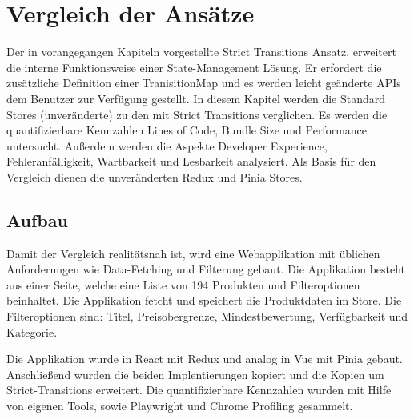 \chapter{Vergleich der Ansätze} \label{vergleich}


Der in vorangegangen Kapiteln vorgestellte Strict Transitions Ansatz, erweitert die interne Funktionsweise einer State-Management Lösung. Er erfordert die zusätzliche Definition einer TranisitionMap und es werden leicht geänderte APIs dem Benutzer zur Verfügung gestellt. In diesem Kapitel werden die Standard Stores (unveränderte) zu den mit Strict Transitions verglichen. Es werden die quantifizierbare Kennzahlen Lines of Code, Bundle Size und Performance untersucht. Außerdem werden die Aspekte Developer Experience, Fehleranfälligkeit, Wartbarkeit und Lesbarkeit analysiert. Als Basis für den Vergleich dienen die unveränderten Redux und Pinia Stores.

\section{Aufbau}

Damit der Vergleich realitätsnah ist, wird eine Webapplikation mit üblichen Anforderungen wie Data-Fetching und Filterung gebaut. Die Applikation besteht aus einer Seite, welche eine Liste von 194 Produkten und Filteroptionen beinhaltet. Die Applikation fetcht und speichert die Produktdaten im Store. Die Filteroptionen sind: Titel, Preisobergrenze, Mindestbewertung, Verfügbarkeit und Kategorie.

Die Applikation wurde in React mit Redux und analog in Vue mit Pinia gebaut. Anschließend wurden die beiden Implentierungen kopiert und die Kopien um Strict-Transitions erweitert. Die quantifizierbare Kennzahlen wurden mit Hilfe von eigenen Tools, sowie Playwright und Chrome Profiling gesammelt.

% 


